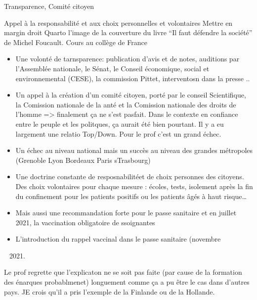 \documentclass[
  ignorenonframetext,
]{beamer}
\providecommand{\tightlist}{%
  \setlength{\itemsep}{0pt}\setlength{\parskip}{0pt}}\usepackage{longtable,booktabs,array}
\begin{document}
\begin{frame}{Transparence, Comité citoyen}
\protect\hypertarget{transparence-comituxe9-citoyen}{}
\begin{block}{Appel à la responsabilité et aux choix personnelles et
volontaires}
\protect\hypertarget{appel-uxe0-la-responsabilituxe9-et-aux-choix-personnelles-et-volontaires}{}
Mettre en margin droit Quarto l'image de la couverture du livre ``Il
faut défendre la société'' de Michel Foucault. Cours au collège de
France

\begin{itemize}
\item
  Une volonté de tarnsparence: publication d'avis et de notes, auditions
  par l'Assemblée nationale, le Sénat, le Conseil économique, social et
  environnemental (CESE), la commission Pittet, interventosn dans la
  presse ..
\item
  Un appel à la création d'un comité citoyen, porté par le conseil
  Scientifique, la Comission nationale de la anté et la Comission
  nationale des droits de l'homme =\textgreater{} finalement ça ne s'est
  pasfait. Dans le contexte en confiance entre le peuple et les
  politques, ça aurait été bien pourtant. Il y a eu largement une
  relatio Top/Down. Pour le prof c'est un grand échec.
\item
  Un échec au niveau national mais un succès au niveau des grandes
  métropoles (Grenoble Lyon Bordeaux Paris sTrasbourg)
\item
  Une doctrine constante de resposnabilitéet de choix personnes des
  citoyens.\\
  Des choix volontaires pour chaque mesure : écoles, tests, isolement
  après la fin du confinement pour les patients positifs ou les patients
  âgés à haut risque\ldots{}
\item
  Mais aussi une recommandation forte pour le passe sanitaire et en
  juillet 2021, la vaccination obligatoire de ssoignantes
\item
  L'introduction du rappel vaccinal dans le passe sanitaire (novembre

  \begin{enumerate}
  [1)]
  \setcounter{enumi}{2020}
  \tightlist
  \item
  \end{enumerate}
\end{itemize}

Le prof regrette que l'explicaton ne se soit pas faite (par cause de la
formation des énarques probablmenet) longuement comme ça a pu être le
cas dans d'autres pays. JE crois qu'il a pris l'exemple de la Finlande
ou de la Hollande.
\end{block}
\end{frame}
\end{document}
